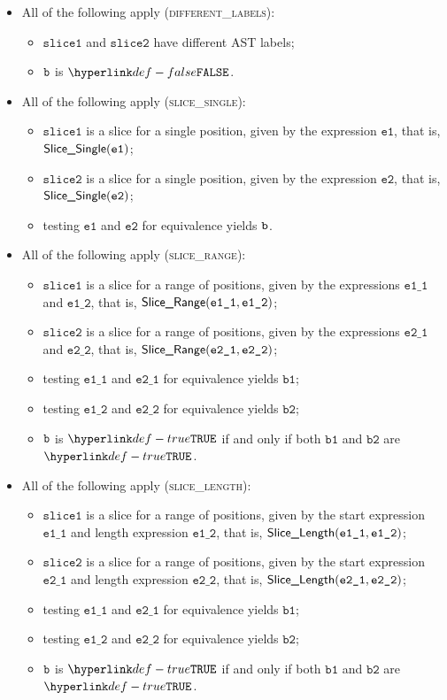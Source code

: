\documentclass{book}
\newcommand\ProseOrTypeError[0]{\ProseTerminateAs{\TypeErrorConfig}}
\newcommand\veone[0]{\texttt{e1}}
\newcommand\vetwo[0]{\texttt{e2}}
\newcommand\veoneone[0]{\texttt{e1\_1}}
\newcommand\veonetwo[0]{\texttt{e1\_2}}
\newcommand\vetwoone[0]{\texttt{e2\_1}}
\newcommand\vetwotwo[0]{\texttt{e2\_2}}
\newcommand\vbone[0]{\texttt{b1}}
\newcommand\vbtwo[0]{\texttt{b2}}
\newcommand\sliceone[0]{\texttt{slice1}}
\newcommand\slicetwo[0]{\texttt{slice2}}
\begin{document}
\begin{itemize}
  \item All of the following apply (\textsc{different\_labels}):
  \begin{itemize}
    \item $\sliceone$ and $\slicetwo$ have different AST labels;
    \item $\texttt{b}$ is $\False$.
  \end{itemize}

  \item All of the following apply (\textsc{slice\_single}):
  \begin{itemize}
    \item $\sliceone$ is a slice for a single position, given by the expression $\veone$, that is, $\SliceSingle(\veone)$;
    \item $\slicetwo$ is a slice for a single position, given by the expression $\vetwo$, that is, $\SliceSingle(\vetwo)$;
    \item testing $\veone$ and $\vetwo$ for equivalence yields $\texttt{b}$\ProseOrTypeError.
  \end{itemize}

  \item All of the following apply (\textsc{slice\_range}):
  \begin{itemize}
    \item $\sliceone$ is a slice for a range of positions, given by the expressions $\veoneone$ and $\veonetwo$, that is, $\SliceRange(\veoneone, \veonetwo)$;
    \item $\slicetwo$ is a slice for a range of positions, given by the expressions $\vetwoone$ and $\vetwotwo$, that is, $\SliceRange(\vetwoone, \vetwotwo)$;
    \item testing $\veoneone$ and $\vetwoone$ for equivalence yields $\vbone$\ProseOrTypeError;
    \item testing $\veonetwo$ and $\vetwotwo$ for equivalence yields $\vbtwo$\ProseOrTypeError;
    \item $\texttt{b}$ is $\True$ if and only if both $\vbone$ and $\vbtwo$ are $\True$.
  \end{itemize}

  \item All of the following apply (\textsc{slice\_length}):
  \begin{itemize}
    \item $\sliceone$ is a slice for a range of positions, given by the start expression $\veoneone$ and length expression $\veonetwo$, that is, $\SliceLength(\veoneone, \veonetwo)$;
    \item $\slicetwo$ is a slice for a range of positions, given by the start expression $\vetwoone$ and length expression $\vetwotwo$, that is, $\SliceLength(\vetwoone, \vetwotwo)$;
    \item testing $\veoneone$ and $\vetwoone$ for equivalence yields $\vbone$\ProseOrTypeError;
    \item testing $\veonetwo$ and $\vetwotwo$ for equivalence yields $\vbtwo$\ProseOrTypeError;
    \item $\texttt{b}$ is $\True$ if and only if both $\vbone$ and $\vbtwo$ are $\True$.
  \end{itemize}
\end{itemize}
\end{document}
